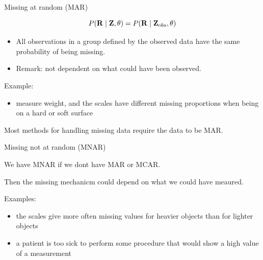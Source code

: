 \documentclass[
  ignorenonframetext,
]{beamer}
\providecommand{\tightlist}{%
  \setlength{\itemsep}{0pt}\setlength{\parskip}{0pt}}
\begin{document}
\begin{frame}

\begin{block}{Missing at random (MAR)}

\[P({\bf R} \mid {\bf Z},\theta)=P({\bf R} \mid {\bf Z}_{\text obs},\theta)\]

\begin{itemize}
\tightlist
\item
  All observations in a group defined by the observed data have the same
  probability of being missing.
\item
  Remark: not dependent on what could have been observed.
\end{itemize}

Example:

\begin{itemize}
\tightlist
\item
  measure weight, and the scales have different missing proportions when
  being on a hard or soft surface
\end{itemize}

Most methods for handling missing data require the data to be MAR.

\end{block}

\end{frame}

\begin{frame}

\begin{block}{Missing not at random (MNAR)}

We have MNAR if we dont have MAR or MCAR.

Then the missing mechanicm could depend on what we could have meaured.

Examples:

\begin{itemize}
\tightlist
\item
  the scales give more often missing values for heavier objects than for
  lighter objects
\item
  a patient is too sick to perform some procedure that would show a high
  value of a measurement
\end{itemize}

\end{block}

\end{frame}
\end{document}
